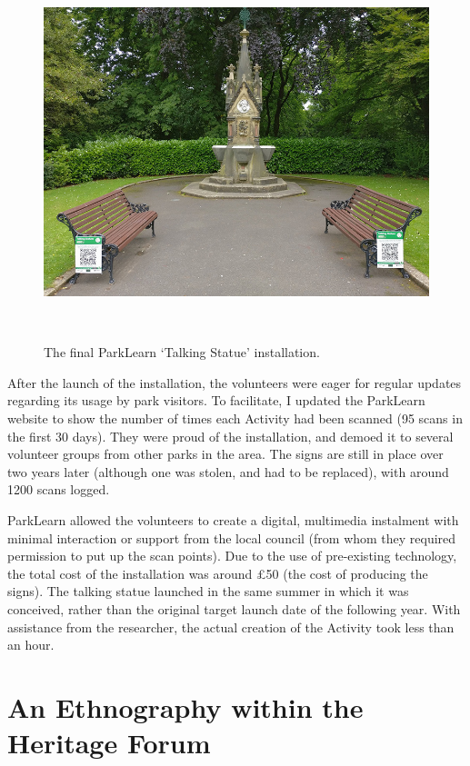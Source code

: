 \begin{figure}
  \centering
  \includegraphics[width=0.9\columnwidth]{images/chapter06/TalkingStatue.jpg}
  \caption[The ParkLearn `Talking Statue' installation]{The final ParkLearn `Talking Statue' installation.}~\label{fig:TalkingStatue}
\end{figure}

After the launch of the installation, the volunteers were eager for regular updates regarding its usage by park visitors. To facilitate, I updated the ParkLearn website to show the number of times each Activity had been scanned (95 scans in the first 30 days). They were proud of the installation, and demoed it to several volunteer groups from other parks in the area. The signs are still in place over two years later (although one was stolen, and had to be replaced), with around 1200 scans logged.

ParkLearn allowed the volunteers to create a digital, multimedia instalment with minimal interaction or support from the local council (from whom they required permission to put up the scan points). Due to the use of pre-existing technology, the total cost of the installation was around £50 (the cost of producing the signs). The talking statue launched in the same summer in which it was conceived, rather than the original target launch date of the following year. With assistance from the researcher, the actual creation of the Activity took less than an hour.

\section{An Ethnography within the Heritage Forum}

